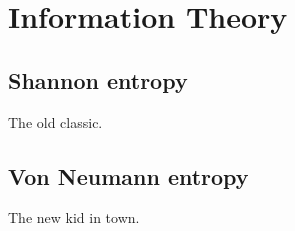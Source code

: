 \chapter{Information Theory}
\label{ch:infth}

\section{Shannon entropy}

The old classic.

\section{Von Neumann entropy}

The new kid in town.